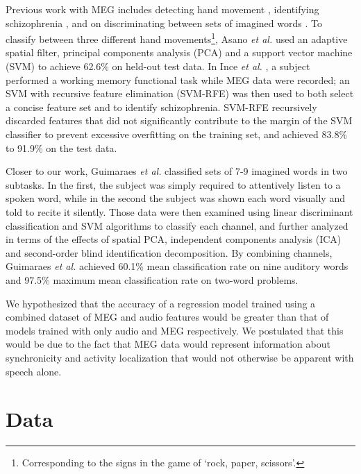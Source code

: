 \documentclass[a4paper]{article}
\begin{document}
Previous work with MEG includes detecting hand movement \cite{Asano2009}, identifying schizophrenia \cite{Ince2008}, and on discriminating between sets of imagined words \cite{Guimaraes2007}. To classify between three different hand movements\footnote{Corresponding to the signs in the game of `rock, paper, scissors'.}, Asano {\em et al.} \cite{Asano2009} used an adaptive spatial filter,
principal components analysis (PCA) and a support vector machine (SVM) to achieve
62.6\% on held-out test data. In Ince {\em et al.} \cite{Ince2008}, a subject performed a working memory functional task while MEG data were recorded; an SVM with recursive feature elimination (SVM-RFE) was then used to both select a concise feature set and to identify schizophrenia. SVM-RFE recursively discarded features that did not significantly contribute to the margin of the SVM classifier to prevent excessive overfitting on the training set, and achieved 83.8\% to 91.9\% on the test data.

Closer to our work, Guimaraes {\em et al.} \cite{Guimaraes2007} classified sets of 7-9 imagined words in two subtasks. In the first, the subject was simply required to attentively listen to a spoken word, while in the second the subject was shown each word visually and told to recite it
silently. Those data were then examined using linear discriminant classification and SVM algorithms to classify each
channel, and further analyzed in terms of the effects of spatial PCA, independent components analysis (ICA) and second-order
blind identification decomposition. By combining channels, Guimaraes {\em et al.} achieved 60.1\% mean classification
rate on nine auditory words and 97.5\% maximum mean classification rate on two-word problems.


We hypothesized that the accuracy of a regression model trained using a combined dataset of MEG and audio features would be greater than that of models trained with only audio and MEG respectively. We postulated that this would be due to the fact that MEG data would represent information about synchronicity and activity localization that would not otherwise be apparent with speech alone.

\section{Data}
\end{document}
